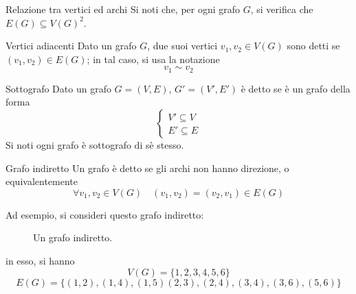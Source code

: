 \documentclass[a4paper, 12pt]{report}
\begin{document}
    \begin{framedobs}{Relazione tra vertici ed archi}
        Si noti che, per ogni grafo $G$, si verifica che $E(G) \subseteq V(G)^2$.
    \end{framedobs}

    \begin{frameddefn}{Vertici adiacenti}
        Dato un grafo $G$, due suoi vertici $v_1, v_2 \in V(G)$ sono detti  se $(v_1, v_2) \in E(G)$; in tal caso, si usa la notazione $$v_1 \sim v_2$$
    \end{frameddefn}

    \begin{frameddefn}{Sottografo}
        Dato un grafo $G = (V, E)$, $G'=(V', E')$ è detto  se è un grafo della forma $$\left \{ \begin{array}{l} V' \subseteq V \\ E' \subseteq E \end{array} \right.$$ Si noti ogni grafo è sottografo di sè stesso.
    \end{frameddefn}

    \begin{frameddefn}{Grafo indiretto}
        Un grafo è detto  se gli archi non hanno direzione, o equivalentemente $$\forall v_1, v_2 \in V(G) \quad (v_1, v_2) = (v_2, v_1) \in E(G)$$
    \end{frameddefn}

    \begin{example}
        Ad esempio, si consideri questo grafo indiretto:

        \begin{figure}[H]
            \centering
            \caption{Un grafo indiretto.}
        \end{figure}

        in esso, si hanno $$V(G) = \{1, 2, 3, 4, 5, 6\}$$ $$E(G) = \{(1, 2), (1, 4), (1, 5) (2, 3), (2, 4), (3, 4), (3, 6), (5, 6)\}$$
    \end{example}
\end{document}
